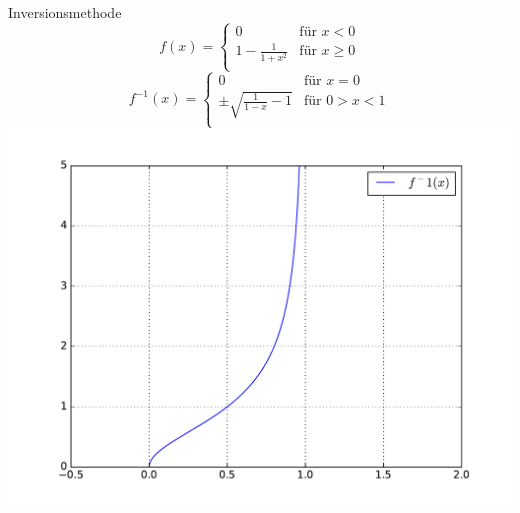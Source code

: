 \begin{frame}{Inversionsmethode}
\begin{equation}
   f(x) =
   \begin{cases}
     0 & \text{für } x < 0 \\
     1 - \frac{1}{1+x^2} & \text{für } x \geq 0 \\
   \end{cases}
\end{equation}
\begin{equation}
   f^{-1}(x) =
   \begin{cases}
     0 & \text{für } x = 0 \\
     \pm \sqrt{\frac{1}{1-x} - 1} & \text{für } 0 > x < 1 \\
   \end{cases}
\end{equation}
	\centering
  	\includegraphics[scale=0.3]{BSP16_plot_function_inverse.pdf}
\end{frame}

